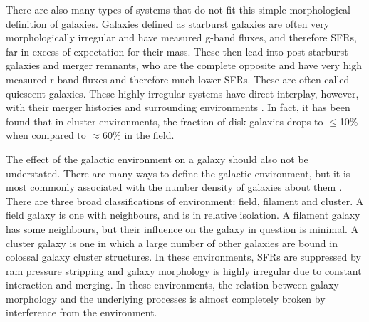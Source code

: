 There are also many types of systems that do not fit this simple morphological definition of galaxies. Galaxies defined as starburst galaxies are often very morphologically irregular and have measured g-band fluxes, and therefore SFRs, far in excess of expectation for their mass. These then lead into post-starburst galaxies and merger remnants, who are the complete opposite and have very high measured r-band fluxes and therefore much lower SFRs. These are often called quiescent galaxies. These highly irregular systems have direct interplay, however, with their merger histories \citep{paper on post-starburst galaxies and merger remnants} and surrounding environments \citep{Paper on post-starburst galaxies and environment}. In fact, it has been found that in cluster environments, the fraction of disk galaxies drops to $\leq$10\% when compared to $\approx$60\% in the field.

The effect of the galactic environment on a galaxy should also not be understated. There are many ways to define the galactic environment, but it is most commonly associated with the number density of galaxies about them \citep{galaxy environment paper}. There are three broad classifications of environment: field, filament and cluster. A field galaxy is one with neighbours, and is in relative isolation. A filament galaxy has some neighbours, but their influence on the galaxy in question is minimal. A cluster galaxy is one in which a large number of other galaxies are bound in colossal galaxy cluster structures. In these environments, SFRs are suppressed \citep{Paper on environmental suppression} by ram pressure stripping and galaxy morphology is highly irregular due to constant interaction and merging. In these environments, the relation between galaxy morphology and the underlying processes is almost completely broken by interference from the environment.

